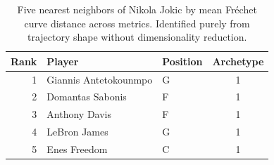 \begin{table}[htbp]
  \centering\small
  \begin{tabular}{rllc}
    \toprule
    Rank & Player & Position & Archetype \\
    \midrule
    1 & Giannis Antetokounmpo & G & 1 \\
    2 & Domantas Sabonis & F & 1 \\
    3 & Anthony Davis & F & 1 \\
    4 & LeBron James & G & 1 \\
    5 & Enes Freedom & C & 1 \\
    \bottomrule
  \end{tabular}
  \caption{Five nearest neighbors of Nikola Jokic by mean Fr\'{e}chet curve distance across metrics. Identified purely from trajectory shape without dimensionality reduction.}
  \label{tab:Nikola_Jokic_frechet_curve_neighbors}
\end{table}

